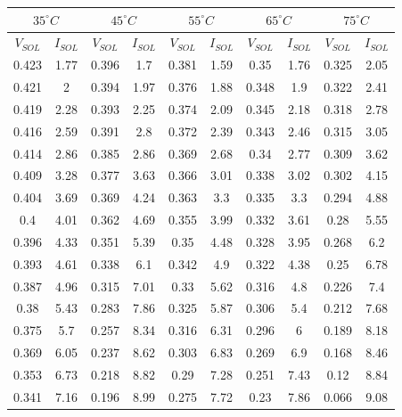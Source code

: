\documentclass[12pt]{article}
\begin{document}
\begin{center}
 \begin{tabular}{|| c c | c c | c c | c c | c c ||} 
 \hline
 \multicolumn{2}{||c|}{\(35^{\circ}C\)} & \multicolumn{2}{c|}{\(45^{\circ}C\)} & \multicolumn{2}{c||}{\(55^{\circ}C\)} & \multicolumn{2}{c||}{\(65^{\circ}C\)} & \multicolumn{2}{c||}{\(75^{\circ}C\)}\\
 \hline
 \hline
 \( V_{SOL} \) & \( I_{SOL} \) & \( V_{SOL} \) & \( I_{SOL} \) & \( V_{SOL} \) & \( I_{SOL} \) & \( V_{SOL} \) & \( I_{SOL} \) & \( V_{SOL} \) & \( I_{SOL} \) \\ [0.25ex] 
 \hline\hline
 \hline 
0.423 & 1.77 & 0.396 & 1.7 & 0.381 & 1.59 & 0.35 & 1.76 & 0.325 & 2.05 \\ \hline 
0.421 & 2 & 0.394 & 1.97 & 0.376 & 1.88 & 0.348 & 1.9 & 0.322 & 2.41 \\ \hline 
0.419 & 2.28 & 0.393 & 2.25 & 0.374 & 2.09 & 0.345 & 2.18 & 0.318 & 2.78 \\ \hline 
0.416 & 2.59 & 0.391 & 2.8 & 0.372 & 2.39 & 0.343 & 2.46 & 0.315 & 3.05 \\ \hline 
0.414 & 2.86 & 0.385 & 2.86 & 0.369 & 2.68 & 0.34 & 2.77 & 0.309 & 3.62 \\ \hline 
0.409 & 3.28 & 0.377 & 3.63 & 0.366 & 3.01 & 0.338 & 3.02 & 0.302 & 4.15 \\ \hline 
0.404 & 3.69 & 0.369 & 4.24 & 0.363 & 3.3 & 0.335 & 3.3 & 0.294 & 4.88 \\ \hline 
0.4 & 4.01 & 0.362 & 4.69 & 0.355 & 3.99 & 0.332 & 3.61 & 0.28 & 5.55 \\ \hline 
0.396 & 4.33 & 0.351 & 5.39 & 0.35 & 4.48 & 0.328 & 3.95 & 0.268 & 6.2 \\ \hline 
0.393 & 4.61 & 0.338 & 6.1 & 0.342 & 4.9 & 0.322 & 4.38 & 0.25 & 6.78 \\ \hline 
0.387 & 4.96 & 0.315 & 7.01 & 0.33 & 5.62 & 0.316 & 4.8 & 0.226 & 7.4 \\ \hline 
0.38 & 5.43 & 0.283 & 7.86 & 0.325 & 5.87 & 0.306 & 5.4 & 0.212 & 7.68 \\ \hline 
0.375 & 5.7 & 0.257 & 8.34 & 0.316 & 6.31 & 0.296 & 6 & 0.189 & 8.18 \\ \hline 
0.369 & 6.05 & 0.237 & 8.62 & 0.303 & 6.83 & 0.269 & 6.9 & 0.168 & 8.46 \\ \hline 
0.353 & 6.73 & 0.218 & 8.82 & 0.29 & 7.28 & 0.251 & 7.43 & 0.12 & 8.84 \\ \hline 
0.341 & 7.16 & 0.196 & 8.99 & 0.275 & 7.72 & 0.23 & 7.86 & 0.066 & 9.08 \\ \hline 

\end{tabular}
\end{center}
\end{document}
